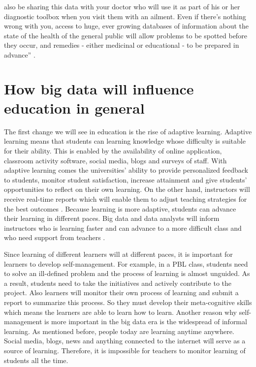 \documentclass[sigconf]{acmart}
\begin{document}
also be sharing this data with your doctor who will use it as part of his or her diagnostic toolbox when you visit them with an ailment. Even if there's nothing wrong with you, access to huge, ever growing databases of information about the state of the health of the general public will allow problems to be spotted before they occur, and remedies - either medicinal or educational - to be prepared in advance'' \cite{Marr2015}.




\section{How big data will influence education in general}
The first change we will see in education is the rise of adaptive learning. Adaptive learning means that students can learning knowledge whose difficulty is suitable for their ability. This is enabled by the availability of online application, classroom activity software, social media, blogs and surveys of staff. With adaptive learning comes the universities' ability to provide personalized feedback to students, monitor student satisfaction, increase attainment and give students' opportunities to reflect on their own learning. On the other hand, instructors will  receive real-time reports which will enable them to adjust teaching strategies for the best outcomes \cite{Learning2016}.  Because learning is more adaptive, students can advance their learning in different paces. Big data and data analysts will inform instructors who is learning faster and can advance to a more difficult class and who need support from teachers \cite{Kerns2013}. 

Since learning of different learners will at different paces, it is important for learners to develop self-management. For example, in a PBL class, students need to solve an ill-defined problem and the process of learning is almost unguided. As a result, students need to take the initiatives and actively contribute to the project. Also learners will monitor their own process of learning and submit a report to summarize this process. So they must develop their meta-cognitive skills which means the learners are able to learn how to learn. Another reason why self-management is more important in the big data era is the widespread of informal learning. As mentioned before, people today are learning anytime anywhere. Social media, blogs, news and anything connected to the internet will serve as a source of learning. Therefore, it is impossible for teachers to monitor learning of students all the time.
\end{document}
